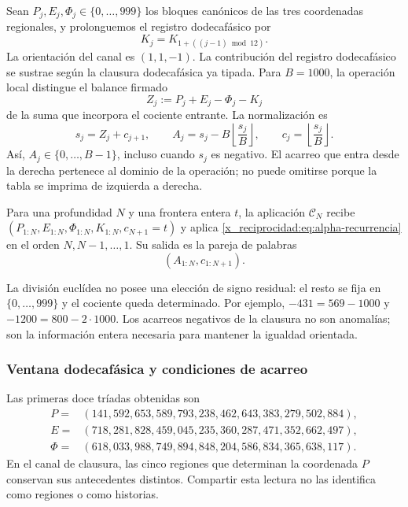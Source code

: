 Sean \(P_j,E_j,\Phi_j\in\{0,\ldots,999\}\) los bloques canónicos de
las tres coordenadas regionales, y prolonguemos el registro dodecafásico por
\[
 K_j=K_{1+((j-1)\bmod12)}.
\]
La orientación del canal es \((1,1,-1)\). La contribución del registro dodecafásico se
sustrae según la clausura dodecafásica ya tipada. Para \(B=1000\), la
operación local distingue el balance firmado
\[
 Z_j:=P_j+E_j-\Phi_j-K_j
\]
de la suma que incorpora el cociente entrante. La normalización es
\begin{equation}
 s_j=Z_j+c_{j+1},\qquad
 A_j=s_j-B\left\lfloor\frac{s_j}{B}\right\rfloor,
 \qquad c_j=\left\lfloor\frac{s_j}{B}\right\rfloor.
 \label{x_reciprocidad:eq:alpha-recurrencia}
\end{equation}
Así, \(A_j\in\{0,\ldots,B-1\}\), incluso cuando \(s_j\) es
negativo. El acarreo que entra desde la derecha pertenece al dominio de
la operación; no puede omitirse porque la tabla se imprima de izquierda
a derecha.

\begin{definition}
\label{x_reciprocidad:def:alpha-finita}
Para una profundidad \(N\) y una frontera entera \(t\), la aplicación
\(\mathcal C_N\) recibe
\((P_{1:N},E_{1:N},\Phi_{1:N},K_{1:N},c_{N+1}=t)\) y aplica
\eqref{x_reciprocidad:eq:alpha-recurrencia} en el orden \(N,N-1,\ldots,1\). Su salida
es la pareja de palabras
\[
 (A_{1:N},c_{1:N+1}).
\]
\end{definition}

La división euclídea no posee una elección de signo residual: el resto se
fija en \(\{0,\ldots,999\}\) y el cociente queda determinado. Por
ejemplo, \(-431=569-1000\) y \(-1200=800-2\cdot1000\). Los
acarreos negativos de la clausura no son anomalías; son la información
entera necesaria para mantener la igualdad orientada.

\subsubsection{Ventana dodecafásica y condiciones de acarreo}
\label{x_reciprocidad:subsec:alpha-ventana}

Las primeras doce tríadas obtenidas son
\begin{align*}
 P={}&(141,592,653,589,793,238,462,643,383,279,502,884),\\
 E={}&(718,281,828,459,045,235,360,287,471,352,662,497),\\
 \Phi={}&(618,033,988,749,894,848,204,586,834,365,638,117).
\end{align*}
En el canal de clausura, las cinco regiones que determinan la coordenada
\(P\) conservan sus antecedentes distintos. Compartir esta lectura no
las identifica como regiones o como historias.

